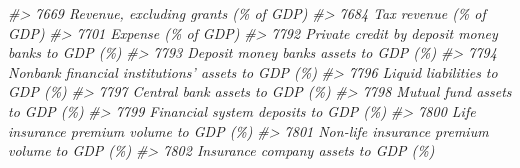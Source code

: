 \documentclass[
]{bxjsbook}
\newenvironment{Shaded}{\begin{snugshade}}{\end{snugshade}}
\newcommand{\CommentTok}[1]{\textcolor[rgb]{0.56,0.35,0.01}{\textit{#1}}}
\theoremstyle{definition}
\theoremstyle{definition}
\theoremstyle{definition}
\theoremstyle{definition}
\theoremstyle{remark}
\begin{document}
\begin{Shaded}
\begin{Highlighting}[]
\CommentTok{\#\textgreater{} 7669                                                                                                                                       Revenue, excluding grants (\% of GDP)}
\CommentTok{\#\textgreater{} 7684                                                                                                                                                     Tax revenue (\% of GDP)}
\CommentTok{\#\textgreater{} 7701                                                                                                                                                         Expense (\% of GDP)}
\CommentTok{\#\textgreater{} 7792                                                                                                                           Private credit by deposit money banks to GDP (\%)}
\CommentTok{\#\textgreater{} 7793                                                                                                                                    Deposit money banks\textquotesingle{}\textquotesingle{} assets to GDP (\%)}
\CommentTok{\#\textgreater{} 7794                                                                                                                          Nonbank financial institutions’ assets to GDP (\%)}
\CommentTok{\#\textgreater{} 7796                                                                                                                                              Liquid liabilities to GDP (\%)}
\CommentTok{\#\textgreater{} 7797                                                                                                                                             Central bank assets to GDP (\%)}
\CommentTok{\#\textgreater{} 7798                                                                                                                                              Mutual fund assets to GDP (\%)}
\CommentTok{\#\textgreater{} 7799                                                                                                                                       Financial system deposits to GDP (\%)}
\CommentTok{\#\textgreater{} 7800                                                                                                                                   Life insurance premium volume to GDP (\%)}
\CommentTok{\#\textgreater{} 7801                                                                                                                               Non{-}life insurance premium volume to GDP (\%)}
\CommentTok{\#\textgreater{} 7802                                                                                                                                        Insurance company assets to GDP (\%)}

\end{Highlighting}
\end{Shaded}
\end{document}
